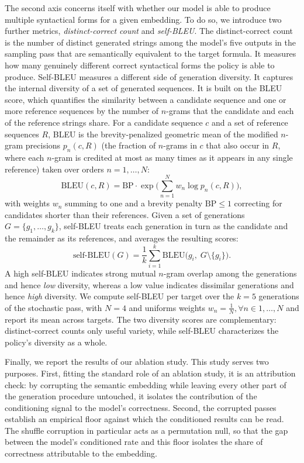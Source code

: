 \documentclass[titlepage,a4paper,11pt]{report}
\begin{document}
    The second axis concerns itself with whether our model is able to produce multiple syntactical forms for a given embedding. To do so, we introduce two further metrics, \textit{distinct-correct count} and \textit{self-BLEU}. The distinct-correct count is the number of distinct generated strings among the model's five outputs in the sampling pass that are semantically equivalent to the target formula. It measures how many genuinely different correct syntactical forms the policy is able to produce. Self-BLEU \citep{zhu_texygen_2018} measures a different side of generation diversity. It captures the internal diversity of a set of generated sequences. It is built on the BLEU score, which quantifies the similarity between a candidate sequence and one or more reference sequences by the number of $n$-grams that the candidate and each of the reference strings share. For a candidate sequence $c$ and a set of reference sequences $R$, BLEU is the brevity-penalized geometric mean of the modified $n$-gram precisions $p_n(c, R)$ (the fraction of $n$-grams in $c$ that also occur in $R$, where each $n$-gram is credited at most as many times as it appears in any single reference) taken over orders $n = 1, \dots, N$:
    \begin{equation}
        \text{BLEU}(c, R) = \mathrm{BP}\cdot\exp\!\Big(\textstyle\sum_{n=1}^{N} w_n \log p_n(c, R)\Big),
    \end{equation}
    with weights $w_n$ summing to one and a brevity penalty $\mathrm{BP} \le 1$ correcting for candidates shorter than their references. Given a set of generations $G = \{g_1, \dots, g_k\}$, self-BLEU treats each generation in turn as the candidate and the remainder as its references, and averages the resulting scores:
    \begin{equation}
        \text{self-BLEU}(G) = \frac{1}{k}\sum_{i=1}^{k} \text{BLEU}\big(g_i,\; G \setminus \{g_i\}\big).
    \end{equation}
    A high self-BLEU indicates strong mutual $n$-gram overlap among the generations and hence \emph{low} diversity, whereas a low value indicates dissimilar generations and hence \emph{high} diversity. We compute self-BLEU per target over the $k = 5$ generations of the stochastic pass, with $N=4$ and uniforms weights $w_n = \frac{1}{N}, \forall n \in 1,\dots,N$ and report its mean across targets. The two diversity scores are complementary: distinct-correct counts only useful variety, while self-BLEU characterizes the policy's diversity as a whole.

    Finally, we report the results of our ablation study. This study serves two purposes. First, fitting the standard role of an ablation study, it is an attribution check: by corrupting the semantic embedding while leaving every other part of the generation procedure untouched, it isolates the contribution of the conditioning signal to the model's correctness. Second, the corrupted passes establish an empirical floor against which the conditioned results can be read. The shuffle corruption in particular acts as a permutation null, so that the gap between the model's conditioned rate and this floor isolates the share of correctness attributable to the embedding.
\end{document}
